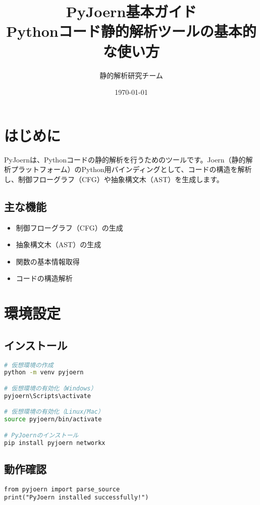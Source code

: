 \documentclass[12pt,a4paper]{article}
\title{\textbf{PyJoern基本ガイド}\\
\large Pythonコード静的解析ツールの基本的な使い方}
\author{静的解析研究チーム}
\date{\today}
\begin{document}
\maketitle
\tableofcontents
\newpage

\section{はじめに}

PyJoernは、Pythonコードの静的解析を行うためのツールです。Joern（静的解析プラットフォーム）のPython用バインディングとして、コードの構造を解析し、制御フローグラフ（CFG）や抽象構文木（AST）を生成します。

\subsection{主な機能}
\begin{itemize}
    \item 制御フローグラフ（CFG）の生成
    \item 抽象構文木（AST）の生成
    \item 関数の基本情報取得
    \item コードの構造解析
\end{itemize}

\section{環境設定}

\subsection{インストール}

\begin{lstlisting}[language=bash]
# 仮想環境の作成
python -m venv pyjoern

# 仮想環境の有効化（Windows）
pyjoern\Scripts\activate

# 仮想環境の有効化（Linux/Mac）
source pyjoern/bin/activate

# PyJoernのインストール
pip install pyjoern networkx
\end{lstlisting}

\subsection{動作確認}

\begin{lstlisting}
from pyjoern import parse_source
print("PyJoern installed successfully!")
\end{lstlisting}
\end{document}
